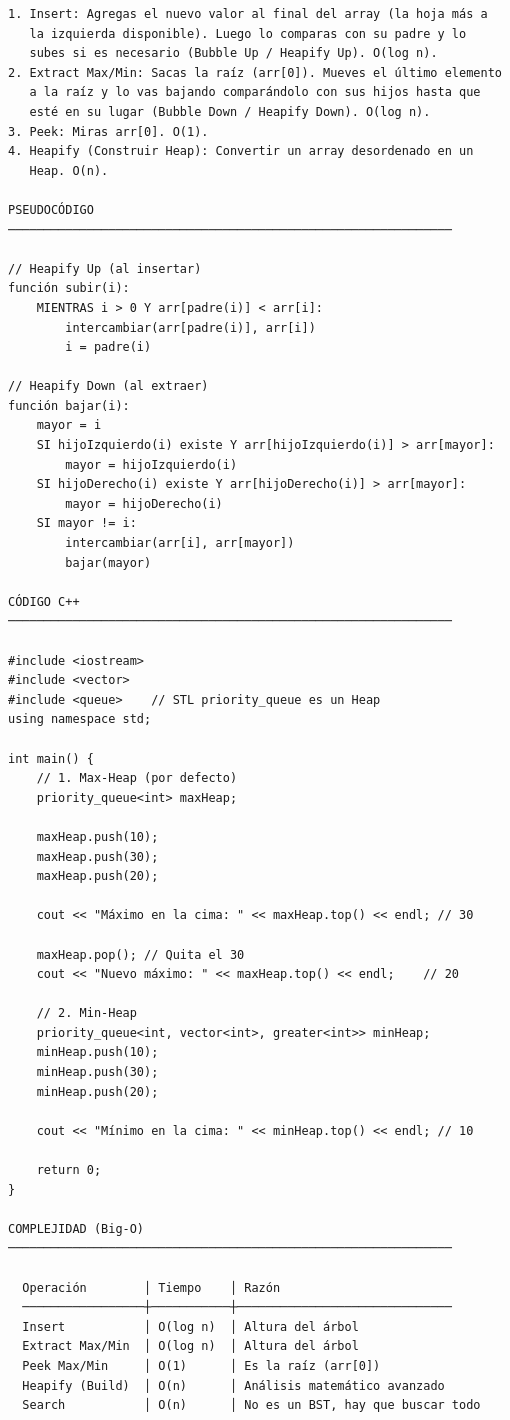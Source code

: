 \begin{lstlisting}
1. Insert: Agregas el nuevo valor al final del array (la hoja más a
   la izquierda disponible). Luego lo comparas con su padre y lo
   subes si es necesario (Bubble Up / Heapify Up). O(log n).
2. Extract Max/Min: Sacas la raíz (arr[0]). Mueves el último elemento
   a la raíz y lo vas bajando comparándolo con sus hijos hasta que
   esté en su lugar (Bubble Down / Heapify Down). O(log n).
3. Peek: Miras arr[0]. O(1).
4. Heapify (Construir Heap): Convertir un array desordenado en un
   Heap. O(n).

PSEUDOCÓDIGO
──────────────────────────────────────────────────────────────

// Heapify Up (al insertar)
función subir(i):
    MIENTRAS i > 0 Y arr[padre(i)] < arr[i]:
        intercambiar(arr[padre(i)], arr[i])
        i = padre(i)

// Heapify Down (al extraer)
función bajar(i):
    mayor = i
    SI hijoIzquierdo(i) existe Y arr[hijoIzquierdo(i)] > arr[mayor]:
        mayor = hijoIzquierdo(i)
    SI hijoDerecho(i) existe Y arr[hijoDerecho(i)] > arr[mayor]:
        mayor = hijoDerecho(i)
    SI mayor != i:
        intercambiar(arr[i], arr[mayor])
        bajar(mayor)

CÓDIGO C++
──────────────────────────────────────────────────────────────

#include <iostream>
#include <vector>
#include <queue>    // STL priority_queue es un Heap
using namespace std;

int main() {
    // 1. Max-Heap (por defecto)
    priority_queue<int> maxHeap;
    
    maxHeap.push(10);
    maxHeap.push(30);
    maxHeap.push(20);

    cout << "Máximo en la cima: " << maxHeap.top() << endl; // 30

    maxHeap.pop(); // Quita el 30
    cout << "Nuevo máximo: " << maxHeap.top() << endl;    // 20

    // 2. Min-Heap
    priority_queue<int, vector<int>, greater<int>> minHeap;
    minHeap.push(10);
    minHeap.push(30);
    minHeap.push(20);

    cout << "Mínimo en la cima: " << minHeap.top() << endl; // 10

    return 0;
}

COMPLEJIDAD (Big-O)
──────────────────────────────────────────────────────────────

  Operación        │ Tiempo    │ Razón
  ─────────────────┼───────────┼──────────────────────────────
  Insert           │ O(log n)  │ Altura del árbol
  Extract Max/Min  │ O(log n)  │ Altura del árbol
  Peek Max/Min     │ O(1)      │ Es la raíz (arr[0])
  Heapify (Build)  │ O(n)      │ Análisis matemático avanzado
  Search           │ O(n)      │ No es un BST, hay que buscar todo
\end{lstlisting}

